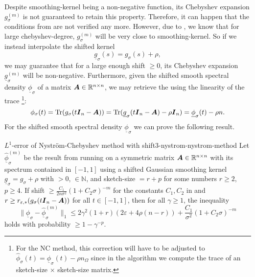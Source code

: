 Despite \gls{smoothing-kernel} being a non-negative function, its Chebyshev
expansion $g_{\sigma}^{(m)}$ is not guaranteed to retain this property.
Therefore, it can happen that the conditions from 
are not verified any more.
However, due to , we know that for large
\gls{chebyshev-degree}, $g_{\sigma}^{(m)}$ will be very close to \gls{smoothing-kernel}.
So if we instead interpolate the shifted kernel
\begin{equation}
    \underline{g}_{\sigma}(s) = g_{\sigma}(s) + \rho,
    \label{equ:3-nystrom-up-shifted-kernel}
\end{equation}
we may guarantee that for a large enough \gls{shift} $\geq 0$, its Chebyshev expansion
$\underline{g}_{\sigma}^{(m)}$ will be non-negative. Furthermore, given
the shifted smooth spectral density $\underline{\phi}_{\sigma}$ of a matrix $\boldsymbol{A} \in \mathbb{R}^{n \times n}$,
we may retrieve the  using the linearity of the trace
\footnote{For the \gls{NC} method, this correction will have to be adjusted to
$\widehat{\phi}_{\sigma}(t) = \underline{\phi}_{\sigma}(t) - \rho n_{\Omega}$
since in the algorithm we compute the trace of an \gls{sketch-size} $\times$ \gls{sketch-size}
matrix.}:
\begin{equation}
    \phi_{\sigma}(t)
    = \operatorname{Tr}(g_{\sigma}(t\boldsymbol{I}_n - \boldsymbol{A}))
    = \operatorname{Tr}(\underline{g}_{\sigma}(t\boldsymbol{I}_n - \boldsymbol{A}) - \rho \boldsymbol{I}_n)
    = \underline{\phi}_{\sigma}(t) - \rho n.
    \label{equ:3-nystrom-revert-shift}
\end{equation}
For the shifted smooth spectral density $\underline{\phi}_{\sigma}$ we can prove the following result.
\begin{theorem}{$L^1$-error of Nystr\"om-Chebyshev method with shift}{3-nystrom-nystrom-method}
    Let $\widehat{\underline{\phi}}_{\sigma}^{(m)}$ be the result from running
     on a symmetric matrix
    $\boldsymbol{A} \in \mathbb{R}^{n \times n}$ with its spectrum contained in $[-1, 1]$
    using a shifted Gaussian smoothing kernel $\underline{g}_{\sigma} = g_{\sigma} + \rho$
    with  $>0$,  $\in \mathbb{N}$, and
    \gls{sketch-size} $=r + p$ for some numbers $r \geq 2$, $p \geq 4$.
    If \gls{shift} $\geq \frac{C_1}{2n\sigma^2} (1 + C_2 \sigma)^{-m}$ for the constants
    $C_1, C_2$ in 
    and $r \geq r_{\varepsilon, \ast}(g_{\sigma}(t\boldsymbol{I}_n - \boldsymbol{A}))$ for all
    $t \in [-1, 1]$, then for all $\gamma \geq 1$, the inequality
    \begin{equation}
        \lVert \underline{\phi}_{\sigma} - \widehat{\underline{\phi}}_{\sigma}^{(m)} \rVert _1
        \leq 2 \gamma^2(1 + r) (2 \varepsilon + 4 \rho (n-r))
        + \frac{C_1}{\sigma^2} (1 + C_2 \sigma)^{-m}
    \end{equation}
    holds with probability $\geq 1-\gamma^{-p}$.
\end{theorem}

